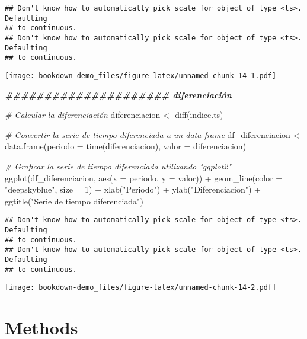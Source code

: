 \documentclass[
]{book}
\newenvironment{Shaded}{\begin{snugshade}}{\end{snugshade}}
\newcommand{\AttributeTok}[1]{\textcolor[rgb]{0.77,0.63,0.00}{#1}}
\newcommand{\CommentTok}[1]{\textcolor[rgb]{0.56,0.35,0.01}{\textit{#1}}}
\newcommand{\DecValTok}[1]{\textcolor[rgb]{0.00,0.00,0.81}{#1}}
\newcommand{\DocumentationTok}[1]{\textcolor[rgb]{0.56,0.35,0.01}{\textbf{\textit{#1}}}}
\newcommand{\FunctionTok}[1]{\textcolor[rgb]{0.00,0.00,0.00}{#1}}
\newcommand{\NormalTok}[1]{#1}
\newcommand{\OtherTok}[1]{\textcolor[rgb]{0.56,0.35,0.01}{#1}}
\newcommand{\SpecialCharTok}[1]{\textcolor[rgb]{0.00,0.00,0.00}{#1}}
\newcommand{\StringTok}[1]{\textcolor[rgb]{0.31,0.60,0.02}{#1}}
\begin{document}
\begin{verbatim}
## Don't know how to automatically pick scale for object of type <ts>. Defaulting
## to continuous.
## Don't know how to automatically pick scale for object of type <ts>. Defaulting
## to continuous.
\end{verbatim}

\texttt{[image: bookdown-demo\_files/figure-latex/unnamed-chunk-14-1.pdf]}

\begin{Shaded}
\begin{Highlighting}[]
\DocumentationTok{\#\#\#\#\#\#\#\#\#\#\#\#\#\#\#\#\#\#\#\#\# diferenciación}

\CommentTok{\# Calcular la diferenciación}
\NormalTok{diferenciacion }\OtherTok{\textless{}{-}} \FunctionTok{diff}\NormalTok{(indice.ts)}


\CommentTok{\# Convertir la serie de tiempo diferenciada a un data frame}
\NormalTok{df\_diferenciacion }\OtherTok{\textless{}{-}} \FunctionTok{data.frame}\NormalTok{(}\AttributeTok{periodo =} \FunctionTok{time}\NormalTok{(diferenciacion), }\AttributeTok{valor =}\NormalTok{ diferenciacion)}

\CommentTok{\# Graficar la serie de tiempo diferenciada utilizando "ggplot2"}
\FunctionTok{ggplot}\NormalTok{(df\_diferenciacion, }\FunctionTok{aes}\NormalTok{(}\AttributeTok{x =}\NormalTok{ periodo, }\AttributeTok{y =}\NormalTok{ valor)) }\SpecialCharTok{+}
  \FunctionTok{geom\_line}\NormalTok{(}\AttributeTok{color =} \StringTok{"deepskyblue"}\NormalTok{, }\AttributeTok{size =} \DecValTok{1}\NormalTok{) }\SpecialCharTok{+}
  \FunctionTok{xlab}\NormalTok{(}\StringTok{"Periodo"}\NormalTok{) }\SpecialCharTok{+} \FunctionTok{ylab}\NormalTok{(}\StringTok{"Diferenciacion"}\NormalTok{) }\SpecialCharTok{+}
  \FunctionTok{ggtitle}\NormalTok{(}\StringTok{"Serie de tiempo diferenciada"}\NormalTok{)}
\end{Highlighting}
\end{Shaded}

\begin{verbatim}
## Don't know how to automatically pick scale for object of type <ts>. Defaulting
## to continuous.
## Don't know how to automatically pick scale for object of type <ts>. Defaulting
## to continuous.
\end{verbatim}

\texttt{[image: bookdown-demo\_files/figure-latex/unnamed-chunk-14-2.pdf]}

\hypertarget{methods}{%
\chapter{Methods}\label{methods}}
\end{document}
